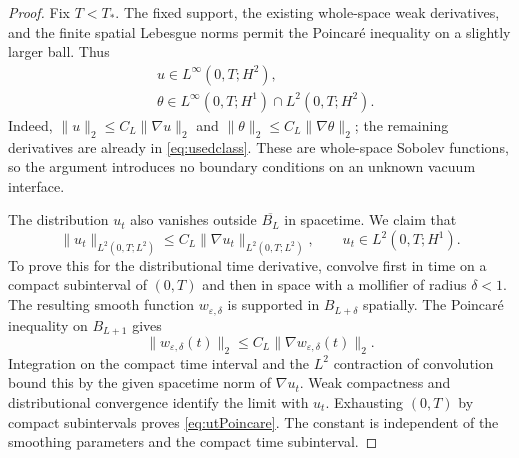 \documentclass[11pt,letterpaper]{article}
\numberwithin{equation}{section}
\theoremstyle{definition}
\newcommand{\norm}[2]{\lVert#1\rVert_{#2}}
\begin{document}
\begin{proof}
Fix $T<T_*$. The fixed support, the existing whole-space weak
derivatives, and the finite spatial Lebesgue norms permit the
Poincar\'e inequality on a slightly larger ball. Thus
\begin{equation}
 \begin{aligned}
 &u\in L^\infty(0,T;H^2),\\
 &\theta\in L^\infty(0,T;H^1)\cap L^2(0,T;H^2).
 \end{aligned}\label{eq:compactSobolev}
\end{equation}
Indeed,
$\norm{u}{2}\le C_L\norm{\nabla u}{2}$ and
$\norm{\theta}{2}\le C_L\norm{\nabla\theta}{2}$; the remaining
derivatives are already in \eqref{eq:usedclass}. These are
whole-space Sobolev functions, so the argument introduces no
boundary conditions on an unknown vacuum interface.

The distribution $u_t$ also vanishes outside $\overline{B_L}$ in
spacetime. We claim that
\begin{equation}
 \norm{u_t}{L^2(0,T;L^2)}
       \le C_L\norm{\nabla u_t}{L^2(0,T;L^2)},
 \qquad u_t\in L^2(0,T;H^1).
 \label{eq:utPoincare}
\end{equation}
To prove this for the distributional time derivative, convolve
first in time on a compact subinterval of $(0,T)$ and then in space
with a mollifier of radius $\delta<1$. The resulting smooth function
$w_{\varepsilon,\delta}$ is supported in $B_{L+\delta}$ spatially.
The Poincar\'e inequality on $B_{L+1}$ gives
\[
 \norm{w_{\varepsilon,\delta}(t)}{2}
       \le C_L\norm{\nabla w_{\varepsilon,\delta}(t)}{2}.
\]
Integration on the compact time interval and the $L^2$ contraction
of convolution bound this by the given spacetime norm of $\nabla u_t$.
Weak compactness and distributional convergence identify the limit
with $u_t$. Exhausting $(0,T)$ by compact subintervals proves
\eqref{eq:utPoincare}. The constant is independent of the smoothing
parameters and the compact time subinterval.


\end{proof}
\end{document}
